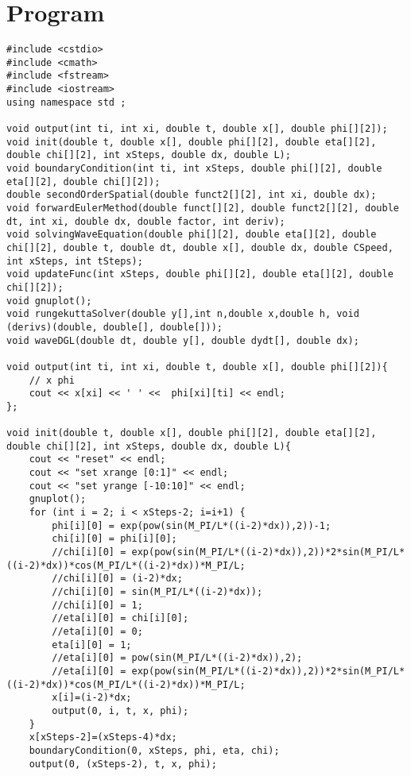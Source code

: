\documentclass[10pt,fleqn,reqno,a4paper]{article}
\begin{document}
\section{Program}
\begin{verbatim}
#include <cstdio>
#include <cmath>
#include <fstream>
#include <iostream>
using namespace std ;

void output(int ti, int xi, double t, double x[], double phi[][2]);
void init(double t, double x[], double phi[][2], double eta[][2], double chi[][2], int xSteps, double dx, double L);
void boundaryCondition(int ti, int xSteps, double phi[][2], double eta[][2], double chi[][2]);
double secondOrderSpatial(double funct2[][2], int xi, double dx);
void forwardEulerMethod(double funct[][2], double funct2[][2], double dt, int xi, double dx, double factor, int deriv);
void solvingWaveEquation(double phi[][2], double eta[][2], double chi[][2], double t, double dt, double x[], double dx, double CSpeed, int xSteps, int tSteps);
void updateFunc(int xSteps, double phi[][2], double eta[][2], double chi[][2]);
void gnuplot();
void rungekuttaSolver(double y[],int n,double x,double h, void (derivs)(double, double[], double[]));
void waveDGL(double dt, double y[], double dydt[], double dx);

void output(int ti, int xi, double t, double x[], double phi[][2]){
    // x phi
    cout << x[xi] << ' ' <<  phi[xi][ti] << endl;
};

void init(double t, double x[], double phi[][2], double eta[][2], double chi[][2], int xSteps, double dx, double L){
    cout << "reset" << endl;
    cout << "set xrange [0:1]" << endl;
    cout << "set yrange [-10:10]" << endl;
    gnuplot();
    for (int i = 2; i < xSteps-2; i=i+1) {
        phi[i][0] = exp(pow(sin(M_PI/L*((i-2)*dx)),2))-1;
        chi[i][0] = phi[i][0];
        //chi[i][0] = exp(pow(sin(M_PI/L*((i-2)*dx)),2))*2*sin(M_PI/L*((i-2)*dx))*cos(M_PI/L*((i-2)*dx))*M_PI/L;
        //chi[i][0] = (i-2)*dx;
        //chi[i][0] = sin(M_PI/L*((i-2)*dx));
        //chi[i][0] = 1;
        //eta[i][0] = chi[i][0];
        //eta[i][0] = 0;
        eta[i][0] = 1;
        //eta[i][0] = pow(sin(M_PI/L*((i-2)*dx)),2);
        //eta[i][0] = exp(pow(sin(M_PI/L*((i-2)*dx)),2))*2*sin(M_PI/L*((i-2)*dx))*cos(M_PI/L*((i-2)*dx))*M_PI/L;
        x[i]=(i-2)*dx;
        output(0, i, t, x, phi);
	}
	x[xSteps-2]=(xSteps-4)*dx;
    boundaryCondition(0, xSteps, phi, eta, chi);
    output(0, (xSteps-2), t, x, phi);


\end{verbatim}
\end{document}
